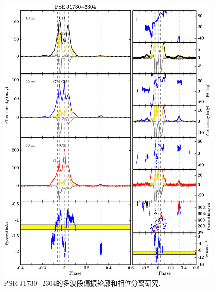 \begin{figure}
\begin{center}
\includegraphics[width=6 in]{1730.ps}
\caption{PSR J1730$-$2304的多波段偏振轮廓和相位分离研究.}
\label{1730}
\end{center}
\end{figure}

